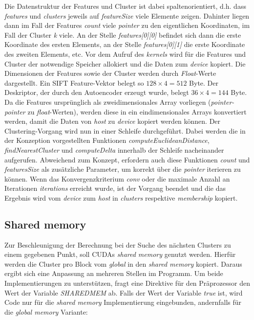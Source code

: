 Die Datenstruktur der Features und Cluster ist dabei spaltenorientiert, d.h. dass \textit{features} und \textit{clusters} jeweils auf \textit{featureSize} viele Elemente zeigen. Dahinter liegen dann im Fall der Features \textit{count} viele \textit{pointer} zu den eigentlichen Koordinaten, im Fall der Cluster \textit{k} viele. An der Stelle \textit{features[0][0]} befindet sich dann die erste Koordinate des ersten Elements, an der Stelle \textit{features[0][1]} die erste Koordinate des zweiten Elements, etc.\newline
Vor dem Aufruf des \textit{kernels} wird für die Features und Cluster der notwendige Speicher allokiert und die Daten zum \textit{device} kopiert. Die Dimensionen der Features sowie der Cluster werden durch \textit{Float}-Werte dargestellt. Ein SIFT Feature-Vektor belegt so $128 \times 4 = 512$ Byte. Der Deskriptor, der durch den Autoencoder erzeugt wurde, belegt $36 \times 4 = 144$ Byte. Da die Features ursprünglich als zweidimensionales Array vorliegen (\textit{pointer-pointer} zu \textit{float}-Werten), werden diese in ein eindimensionales Arrays konvertiert werden, damit die Daten von \textit{host} zu \textit{device} kopiert werden können.\newline
Der Clustering-Vorgang wird nun in einer Schleife durchgeführt. Dabei werden die in der Konzeption vorgestellten Funktionen \textit{computeEuclideanDistance}, \textit{findNearestCluster} und \textit{computeDelta} innerhalb der Schleife nacheinander aufgerufen. Abweichend zum Konzept, erfordern auch diese Funktionen \textit{count} und \textit{featuresSize} als zusätzliche Parameter, um korrekt über die \textit{pointer} iterieren zu können.
Wenn das Konvergenzkriterium \textit{conv} oder die maximale Anzahl an Iterationen \textit{iterations} erreicht wurde, ist der Vorgang beendet und die das Ergebnis wird vom \textit{device} zum \textit{host} in \textit{clusters} respektive \textit{membership} kopiert.

\subsection{Shared memory}

Zur Beschleunigung der Berechnung bei der Suche des nächsten Clusters zu einem gegebenen Punkt, soll CUDAs \textit{shared memory} genutzt werden. Hierfür werden die Cluster pro Block vom \textit{global} in den \textit{shared memory} kopiert. Daraus ergibt sich eine Anpassung an mehreren Stellen im Programm. Um beide Implementierungen zu unterstützen, fragt eine Direktive für den Präprozessor den Wert der Variable \textit{SHARED\textunderscore MEM} ab. Falls der Wert der Variable \textit{true} ist, wird Code nur für die \textit{shared memory} Implementierung eingebunden, andernfalls für die \textit{global memory} Variante:

